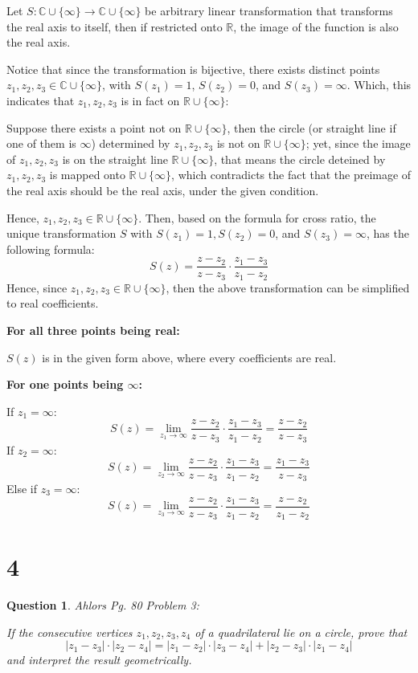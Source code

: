 \documentclass{article}
\newtheorem{question}{Question}
\begin{document}
Let $S:\mathbb{C}\cup\{\infty\}\rightarrow \mathbb{C}\cup\{\infty\}$ be arbitrary linear transformation that transforms the real axis to itself, then if restricted onto $\mathbb{R}$, 
the image of the function is also the real axis. 

Notice that since the transformation is bijective,
there exists distinct points $z_1,z_2,z_3\in\mathbb{C}\cup\{\infty\}$, with $S(z_1)=1$, $S(z_2)=0$, and $S(z_3)=\infty$.
Which, this indicates that $z_1,z_2,z_3$ is in fact on $\mathbb{R}\cup\{\infty\}$:

Suppose there exists a point not on $\mathbb{R}\cup\{\infty\}$, then the circle (or straight line if one of them is $\infty$) determined by $z_1,z_2,z_3$ is not on $\mathbb{R}\cup\{\infty\}$;
yet, since the image of $z_1,z_2,z_3$ is on the straight line $\mathbb{R}\cup\{\infty\}$,
that means the circle deteined by $z_1,z_2,z_3$ is mapped onto $\mathbb{R}\cup\{\infty\}$, which contradicts the fact that the preimage
of the real axis should be the real axis, under the given condition.

\hfill

Hence, $z_1,z_2,z_3\in \mathbb{R}\cup\{\infty\}$. Then, based on the formula for cross ratio,
the unique transformation $S$ with $S(z_1)=1, S(z_2)=0$, and $S(z_3)=\infty$, has the following formula:
$$S(z)=\frac{z-z_2}{z-z_3}\cdot\frac{z_1-z_3}{z_1-z_2}$$
Hence, since $z_1,z_2,z_3\in \mathbb{R}\cup\{\infty\}$, then the above transformation can be simplified to real coefficients.

\hfill

\textbf{For all three points being real:}

$S(z)$ is in the given form above, where every coefficients are real.

\hfill

\textbf{For one points being $\infty$:}

If $z_1=\infty$:
$$S(z)=\lim_{z_1\rightarrow\infty}\frac{z-z_2}{z-z_3}\cdot\frac{z_1-z_3}{z_1-z_2}=\frac{z-z_2}{z-z_3}$$
If $z_2=\infty$:
$$S(z)=\lim_{z_2\rightarrow\infty}\frac{z-z_2}{z-z_3}\cdot\frac{z_1-z_3}{z_1-z_2}=\frac{z_1-z_3}{z-z_3}$$
Else if $z_3=\infty$:
$$S(z)=\lim_{z_3\rightarrow\infty}\frac{z-z_2}{z-z_3}\cdot\frac{z_1-z_3}{z_1-z_2}=\frac{z-z_2}{z_1-z_2}$$



\break

\section*{4}
\begin{myBox}[]{}
    \begin{question}
        Ahlors Pg. 80 Problem 3:

        If the consecutive vertices $z_1,z_2,z_3,z_4$ of a quadrilateral lie on a circle, prove that
        $$|z_1-z_3|\cdot|z_2-z_4|=|z_1-z_2|\cdot|z_3-z_4|+|z_2-z_3|\cdot|z_1-z_4|$$
        and interpret the result geometrically.
    \end{question}
\end{myBox}
\end{document}
